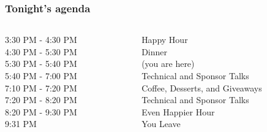 \documentclass[xcolor=dvipsnames,red]{beamer}
\begin{document}
\begin{frame}
\frametitle{Tonight's agenda}
\begin{columns}

\begin{column}{.35\textwidth}
3:30 PM - 4:30 PM\\
4:30 PM - 5:30 PM\\
5:30 PM - 5:40 PM\\
5:40 PM - 7:00 PM\\
7:10 PM - 7:20 PM\\
7:20 PM - 8:20 PM\\
8:20 PM - 9:30 PM\\
9:31 PM
\end{column}

\begin{column}{.65\textwidth}
Happy Hour\\
Dinner\\
(you are here)\\
Technical and Sponsor Talks\\
Coffee, Desserts, and Giveaways\\
Technical and Sponsor Talks\\
Even Happier Hour\\
You Leave
\end{column}

\end{columns}
\end{frame}
\end{document}
